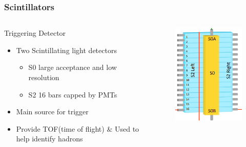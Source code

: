\documentclass{beamer}
\begin{document}

\begin{frame}
\frametitle{Scintillators}
\vspace{-8pt}
	\begin{columns}
		\begin{block}{Triggering Detector}
			\begin{itemize}
				\item Two Scintillating light detectors
				\begin{itemize}
					\item S0 large acceptance and low resolution
					\item S2 16 bars capped by PMTs
				\end{itemize}
				\item Main source for trigger
				\item Provide TOF(time of flight) $\&$ Used to help identify hadrons \cite{nim}
			\end{itemize}
		
		\end{block}
		\begin{figure}
			\includegraphics[width=5cm]{../images/Scins}
		\end{figure}
	\end{columns}
\end{frame}
\end{document}
